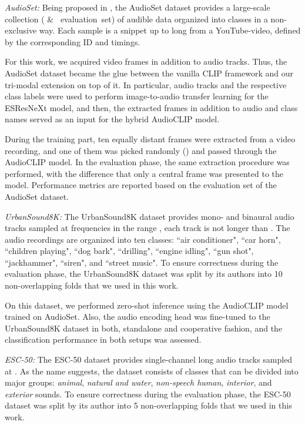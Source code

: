 \documentclass[runningheads]{llncs}
\begin{document}
\emph{AudioSet:} Being proposed in \cite{gemmeke2017audioset}, the \mbox{AudioSet} dataset provides a large-scale collection (\mbox{\:\si{\mega}} \& \mbox{\:\si{\kilo} evaluation set}) of audible data organized into  classes in a non-exclusive way.
Each sample is a snippet up to  long from a {YouTube}-video, defined by the corresponding ID and timings.

For this work, we acquired video frames in addition to audio tracks.
Thus, the \mbox{AudioSet} dataset became the glue between the vanilla CLIP framework and our tri-modal extension on top of it.
In particular, audio tracks and the respective class labels were used to perform image-to-audio transfer learning for the \mbox{ESResNeXt} model, and then, the extracted frames in addition to audio and class names served as an input for the hybrid \mbox{AudioCLIP} model.

During the training part, ten equally distant frames were extracted from a video recording, and one of them was picked randomly () and passed through the \mbox{AudioCLIP} model.
In the evaluation phase, the same extraction procedure was performed, with the difference that only a central frame was presented to the model.
Performance metrics are reported based on the evaluation set of the \mbox{AudioSet} dataset.

\emph{UrbanSound8K:} The \mbox{UrbanSound8K} dataset provides  mono- and binaural audio tracks sampled at frequencies in the range , each track is not longer than .
The audio recordings are organized into ten classes: ``air conditioner", ``car horn", ``children playing", ``dog bark", ``drilling", ``engine idling", ``gun shot", ``jackhammer", ``siren", and ``street music".
To ensure correctness during the evaluation phase, the \mbox{UrbanSound8K} dataset was split by its authors into 10 non-overlapping folds \cite{salamon2014us8k} that we used in this work.

On this dataset, we performed zero-shot inference using the \mbox{AudioCLIP} model trained on \mbox{AudioSet}.
Also, the audio encoding head was fine-tuned to the \mbox{UrbanSound8K} dataset in both, standalone and cooperative fashion, and the classification performance in both setups was assessed.

\emph{ESC-50:} The \mbox{ESC-50} dataset provides  single-channel  long audio tracks sampled at .
As the name suggests, the dataset consists of  classes that can be divided into  major groups: \emph{animal}, \emph{natural and water}, \emph{non-speech human}, \emph{interior}, and \emph{exterior} sounds.
To ensure correctness during the evaluation phase, the \mbox{ESC-50} dataset was split by its author into 5 non-overlapping folds \cite{piczak2015esc} that we used in this work.
\end{document}

